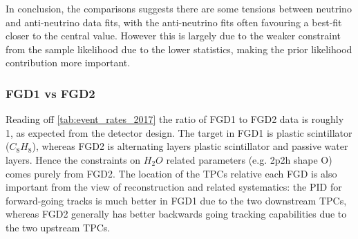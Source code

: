 In conclusion, the comparisons suggests there are some tensions between neutrino and anti-neutrino data fits, with the anti-neutrino fits often favouring a best-fit closer to the central value. However this is largely due to the weaker constraint from the sample likelihood due to the lower statistics, making the prior likelihood contribution more important.

\subsubsection{FGD1 vs FGD2}
Reading off \autoref{tab:event_rates_2017} the ratio of FGD1 to FGD2 data is roughly 1, as expected from the detector design. The target in FGD1 is plastic scintillator ($C_8H_8$), whereas FGD2 is alternating layers plastic scintillator and passive water layers. Hence the constraints on $H_2O$ related parameters (e.g. 2p2h shape O) comes purely from FGD2. The location of the TPCs relative each FGD is also important from the view of reconstruction and related systematics: the PID for forward-going tracks is much better in FGD1 due to the two downstream TPCs, whereas FGD2 generally has better backwards going tracking capabilities due to the two upstream TPCs.

